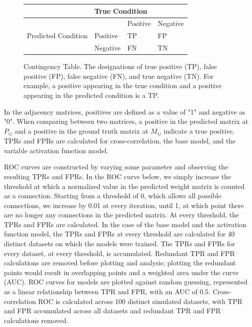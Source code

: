 \documentclass[11pt,titlepage]{article}
\begin{document}
\begin{figure}[H]
\centering
\begin{tabular}{|l|l|l|l|}
\hline
                                     & \multicolumn{3}{l|}{True Condition} \\ \hline
\multirow{3}{*}{Predicted Condition} &            & Positive   & Negative  \\ \cline{2-4} 
                                     & Positive   & TP         & FP        \\ \cline{2-4} 
                                     & Negative   & FN         & TN        \\ \hline
\end{tabular}
\caption[Contingency Table]{Contingency Table. The designations of true positive (TP), false positive (FP), false negative (FN), and true negative (TN). For example, a positive appearing in the true condition and a positive appearing in the predicted condition is a TP.}
\label{contingencyTable}
\end{figure}
In the adjacency matrices, positives are defined as a value of "1" and negative as "0". When comparing between two matrices, a positive in the predicted matrix at $P_{ij}$ and a positive in the ground truth matrix at $M_{ij}$ indicate a true positive. TPRs and FPRs are calculated for cross-correlation, the base model, and the variable activation function model.\par
ROC curves are constructed by varying some parameter and observing the resulting TPRs and FPRs. In the ROC curve below, we simply increase the threshold at which a normalized value in the predicted weight matrix is counted as a connection. Starting from a threshold of 0, which allows all possible connections, we increase by 0.01 at every iteration, until 1, at which point there are no longer any connections in the predicted matrix. At every threshold, the TPRs and FPRs are calculated. In the case of the base model and the activation function model, the TPRs and FPRs at every threshold are calculated for 40 distinct datasets on which the models were trained. The TPRs and FPRs for every dataset, at every threshold, is accumulated. Redundant TPR and FPR calculations are removed before plotting and analysis; plotting the redundant points would result in overlapping points and a weighted area under the curve (AUC). ROC curves for models are plotted against random guessing, represented as a linear relationship between TPR and FPR, with an AUC of 0.5. Cross-correlation ROC is calculated across 100 distinct simulated datasets, with TPR and FPR accumulated across all datasets and redundant TPR and FPR calculations removed.\par
\end{document}
